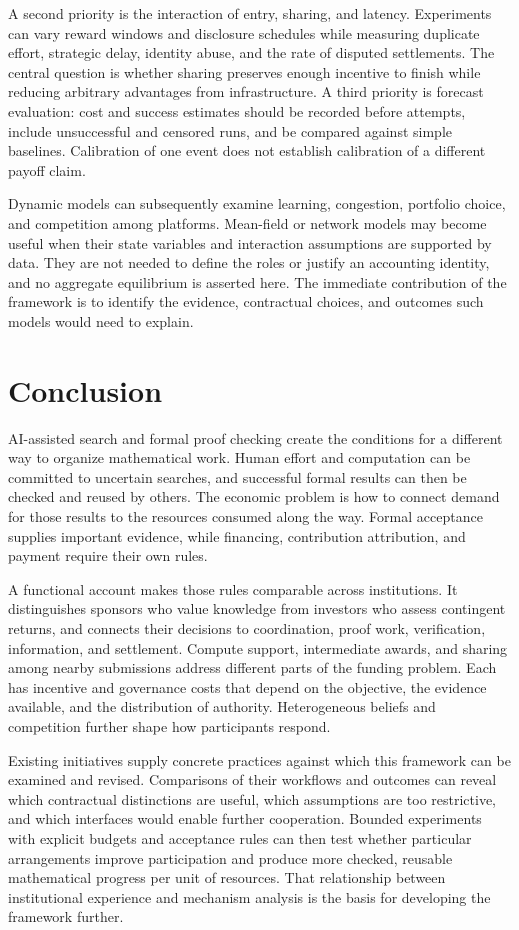 \documentclass[11pt,a4paper]{article}
\begin{document}
A second priority is the interaction of entry, sharing, and latency. Experiments can vary reward windows and disclosure schedules while measuring duplicate effort, strategic delay, identity abuse, and the rate of disputed settlements. The central question is whether sharing preserves enough incentive to finish while reducing arbitrary advantages from infrastructure. A third priority is forecast evaluation: cost and success estimates should be recorded before attempts, include unsuccessful and censored runs, and be compared against simple baselines. Calibration of one event does not establish calibration of a different payoff claim.

Dynamic models can subsequently examine learning, congestion, portfolio choice, and competition among platforms. Mean-field or network models may become useful when their state variables and interaction assumptions are supported by data. They are not needed to define the roles or justify an accounting identity, and no aggregate equilibrium is asserted here. The immediate contribution of the framework is to identify the evidence, contractual choices, and outcomes such models would need to explain.

\section{Conclusion}
AI-assisted search and formal proof checking create the conditions for a different way to organize mathematical work. Human effort and computation can be committed to uncertain searches, and successful formal results can then be checked and reused by others. The economic problem is how to connect demand for those results to the resources consumed along the way. Formal acceptance supplies important evidence, while financing, contribution attribution, and payment require their own rules.

A functional account makes those rules comparable across institutions. It distinguishes sponsors who value knowledge from investors who assess contingent returns, and connects their decisions to coordination, proof work, verification, information, and settlement. Compute support, intermediate awards, and sharing among nearby submissions address different parts of the funding problem. Each has incentive and governance costs that depend on the objective, the evidence available, and the distribution of authority. Heterogeneous beliefs and competition further shape how participants respond.

Existing initiatives supply concrete practices against which this framework can be examined and revised. Comparisons of their workflows and outcomes can reveal which contractual distinctions are useful, which assumptions are too restrictive, and which interfaces would enable further cooperation. Bounded experiments with explicit budgets and acceptance rules can then test whether particular arrangements improve participation and produce more checked, reusable mathematical progress per unit of resources. That relationship between institutional experience and mechanism analysis is the basis for developing the framework further.
\end{document}
